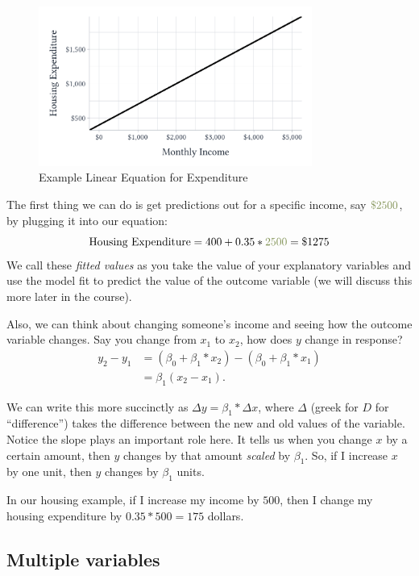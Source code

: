 \documentclass[12pt]{article}
\begin{document}
\begin{figure}
  \caption{Example Linear Equation for Expenditure}
  \label{fig:example_housing_line}
  \begin{center}
    \includegraphics[width=0.8\textwidth]{figures/line_housing.pdf}
  \end{center}
\end{figure}

The first thing we can do is get predictions out for a specific income, say $\kelly{\$2500}$, by plugging it into our equation:
$$
  \text{Housing Expenditure} = 400 + 0.35 * \kelly{2500} = \$1275
$$
We call these \emph{fitted values} as you take the value of your explanatory variables and use the model fit to predict the value of the outcome variable (we will discuss this more later in the course). 

Also, we can think about changing someone's income and seeing how the outcome variable changes. Say you change from $x_1$ to $x_2$, how does $y$ change in response?
\begin{align*}
  y_2 - y_1 
  &= (\beta_0 + \beta_1 * x_2) - (\beta_0 + \beta_1 * x_1) \\
  &= \beta_1 (x_2 - x_1).
\end{align*}

We can write this more succinctly as $\Delta y = \beta_1 * \Delta x$, where $\Delta$ (greek for $D$ for ``difference'') takes the difference between the new and old values of the variable. Notice the slope plays an important role here. It tells us when you change $x$ by a certain amount, then $y$ changes by that amount \emph{scaled} by $\beta_1$. So, if I increase $x$ by one unit, then $y$ changes by $\beta_1$ units.

In our housing example, if I increase my income by $500$, then I change my housing expenditure by $0.35 * 500 = 175$ dollars.

\subsection*{Multiple variables}
\end{document}
